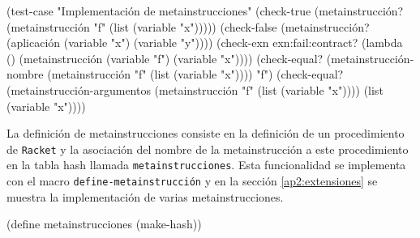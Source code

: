 \documentclass[10pt,oneside,openany,letterpaper]{book}
\begin{document}
\nwenddocs{}\plusendmoddef
(test-case "Implementación de metainstrucciones"  
  (check-true (metainstrucción? (metainstrucción "f" (list (variable "x")))))
  (check-false (metainstrucción? (aplicación (variable "x") (variable "y"))))
  (check-exn exn:fail:contract?
             (lambda () (metainstrucción (variable "f") (variable "x"))))
  (check-equal? (metainstrucción-nombre
                 (metainstrucción "f" (list (variable "x")))) "f")
  (check-equal? (metainstrucción-argumentos
                 (metainstrucción "f" (list (variable "x"))))
                (list (variable "x"))))
\nwendcode{}\nwdocspar

La definición de metainstrucciones consiste en la definición de un procedimiento de {\tt{}Racket} y la asociación del nombre de la metainstrucción a este procedimiento en la tabla hash llamada {\tt{}\protect{}metainstrucciones}. Esta funcionalidad se implementa con el macro {\tt{}define-\protect{}metainstrucción\protect{}} y en la sección \ref{ap2:extensiones} se muestra la implementación de varias metainstrucciones.

\nwenddocs{}\plusendmoddef
(define metainstrucciones (make-hash))
\end{document}
